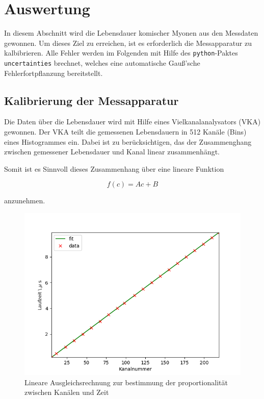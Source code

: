 \section{Auswertung}
\label{sec:evaluation}
In diesem Abschnitt wird die Lebensdauer komischer Myonen aus den Messdaten gewonnen.
Um dieses Ziel zu erreichen, ist es erforderlich die Messapparatur zu kalbibrieren.
Alle Fehler werden im Folgenden mit Hilfe
des \texttt{python}-Paktes \texttt{uncertainties} brechnet, welches eine automatische
Gauß'sche Fehlerfortpflanzung bereitstellt.

\subsection{Kalibrierung der Messapparatur}
\label{subsec:calibration}
Die Daten über die Lebensdauer wird mit Hilfe eines Vielkanalanalysators (VKA) gewonnen.
Der VKA teilt die gemessenen Lebensdauern in \num{512} Kanäle (Bins) eines Histogrammes ein.
Dabei ist zu berücksichtigen, das der Zusammenghang zwischen gemessener Lebensdauer und
Kanal linear zusammenhängt.

\noindent Somit ist es Sinnvoll dieses Zusammenhang über eine lineare Funktion

\begin{equation}
f(c) = Ac + B
\end{equation}

\noindent anzunehmen. 

\begin{figure}
	\centering
	\includegraphics[width=\textwidth]{img/calib.png}
	\caption{Lineare Ausgleichsrechnung zur bestimmung der proportionalität zwischen Kanälen und Zeit}
	\label{abb:cal}
\end{figure}

